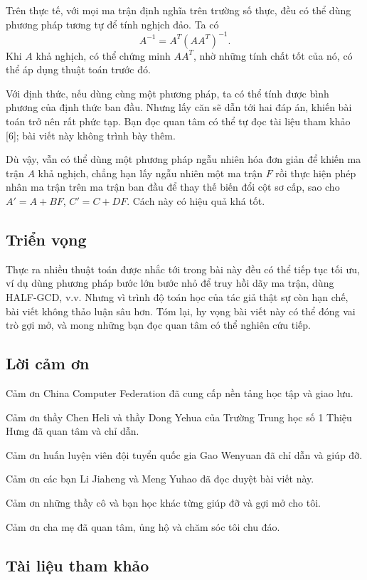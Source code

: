 \documentclass[11pt]{article}
\begin{document}
Trên thực tế, với mọi ma trận định nghĩa trên trường số thực, đều có thể dùng
phương pháp tương tự để tính nghịch đảo. Ta có
\[
  A^{-1}=A^T(AA^T)^{-1}.
\]
Khi \(A\) khả nghịch, có thể chứng minh \(AA^T\), nhờ những tính chất tốt của
nó, có thể áp dụng thuật toán trước đó.

Với định thức, nếu dùng cùng một phương pháp, ta có thể tính được bình phương
của định thức ban đầu. Nhưng lấy căn sẽ dẫn tới hai đáp án, khiến bài toán trở
nên rất phức tạp. Bạn đọc quan tâm có thể tự đọc tài liệu tham khảo [6]; bài
viết này không trình bày thêm.

Dù vậy, vẫn có thể dùng một phương pháp ngẫu nhiên hóa đơn giản để khiến ma trận
\(A\) khả nghịch, chẳng hạn lấy ngẫu nhiên một ma trận \(F\) rồi thực hiện phép
nhân ma trận trên ma trận ban đầu để thay thế biến đổi cột sơ cấp, sao cho
\(A'=A+BF\), \(C'=C+DF\). Cách này có hiệu quả khá tốt.

\subsection{Triển vọng}

Thực ra nhiều thuật toán được nhắc tới trong bài này đều có thể tiếp tục tối ưu,
ví dụ dùng phương pháp bước lớn bước nhỏ để truy hồi dãy ma trận, dùng
HALF-GCD, v.v. Nhưng vì trình độ toán học của tác giả thật sự còn hạn chế, bài
viết không thảo luận sâu hơn. Tóm lại, hy vọng bài viết này có thể đóng vai trò
gợi mở, và mong những bạn đọc quan tâm có thể nghiên cứu tiếp.

\subsection*{Lời cảm ơn}

Cảm ơn China Computer Federation đã cung cấp nền tảng học tập và giao lưu.

Cảm ơn thầy Chen Heli và thầy Dong Yehua của Trường Trung học số 1 Thiệu Hưng đã
quan tâm và chỉ dẫn.

Cảm ơn huấn luyện viên đội tuyển quốc gia Gao Wenyuan đã chỉ dẫn và giúp đỡ.

Cảm ơn các bạn Li Jiaheng và Meng Yuhao đã đọc duyệt bài viết này.

Cảm ơn những thầy cô và bạn học khác từng giúp đỡ và gợi mở cho tôi.

Cảm ơn cha mẹ đã quan tâm, ủng hộ và chăm sóc tôi chu đáo.

\subsection*{Tài liệu tham khảo}
\end{document}
